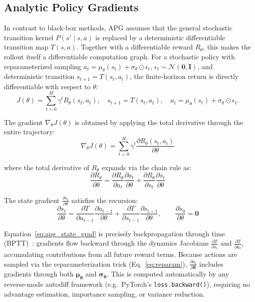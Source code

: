 \documentclass[11pt,a4paper]{article}
\newcommand{\btheta}{\bm{\theta}}
\newcommand{\bmu}{\bm{\mu}}
\newcommand{\bsigma}{\bm{\sigma}}
\begin{document}
\subsection{Analytic Policy Gradients}
\label{sec:apg_concept}

In contrast to black-box methods, APG assumes that the general stochastic transition kernel $P(s' \mid s, a)$ is replaced by a deterministic differentiable transition map $T(s, a)$. Together with a differentiable reward $R_\theta$, this makes the rollout itself a differentiable computation graph. For a stochastic policy with reparameterized sampling $a_t = \mu_{\theta}(s_t) + \sigma_{\theta} \odot \epsilon_t$, $\epsilon_t \sim \mathcal{N}(\mathbf{0}, \mathbf{I})$, and deterministic transition $s_{t+1} = T(s_t, a_t)$, the finite-horizon return is directly differentiable with respect to $\theta$:
\begin{equation}
  J(\theta) = \sum_{t=0}^{H} \gamma^t R_{\theta}(s_t, a_t), \quad
  s_{t+1} = T(s_t, a_t), \quad
  a_t = \mu_{\theta}(s_t) + \sigma_{\theta} \odot \epsilon_t .
  \label{eq:apg_return}
\end{equation}

The gradient $\nabla_{\theta} J(\theta)$ is obtained by applying the total derivative through the entire trajectory:
\begin{equation}
  \nabla_{\theta} J(\theta) = \sum_{t=0}^{H} \gamma^t \frac{\partial R_{\theta}(s_t, a_t)}{\partial \theta}
  \label{eq:apg_grad}
\end{equation}

where the total derivative of $R_{\theta}$ expands via the chain rule as:
\begin{equation}
  \frac{\partial R_{\theta}}{\partial \theta}
  =
  \frac{\partial R_{\theta}}{\partial a_t}\frac{\partial a_t}{\partial \theta}
  + \frac{\partial R_{\theta}}{\partial s_t}\frac{\partial s_t}{\partial \theta}
  \label{eq:apg_chain}
\end{equation}

The state gradient $\tfrac{\partial s_t}{\partial \theta}$ satisfies the recursion:
\begin{equation}
  \frac{\partial s_t}{\partial \theta}
  =
  \frac{\partial T}{\partial a_{t-1}}\frac{\partial a_{t-1}}{\partial \theta}
  + \frac{\partial T}{\partial s_{t-1}}\frac{\partial s_{t-1}}{\partial \theta}, \qquad
  \frac{\partial s_0}{\partial \theta} = \mathbf{0}
  \label{eq:apg_state_grad}
\end{equation}

Equation~\eqref{eq:apg_state_grad} is precisely backpropagation through time (BPTT)~\cite{werbos1990bptt}: gradients flow backward through the dynamics Jacobians $\tfrac{\partial T}{\partial s_t}$ and $\tfrac{\partial T}{\partial a_t}$, accumulating contributions from all future reward terms. Because actions are sampled via the reparameterization trick (Eq.~\eqref{eq:reparam}), $\tfrac{\partial a_t}{\partial \btheta}$ includes gradients through both $\bmu_{\btheta}$ and $\bsigma_{\btheta}$. This is computed automatically by any reverse-mode autodiff framework (e.g.\ PyTorch's \texttt{loss.backward()}), requiring no advantage estimation, importance sampling, or variance reduction.
\end{document}
